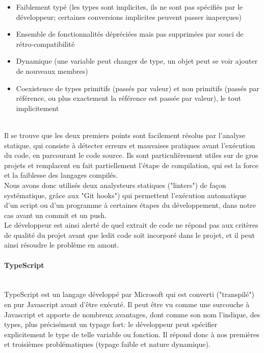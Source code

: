 \documentclass[a4paper,french,12pt]{article}
\begin{document}
		\begin{itemize}
			\item Faiblement typé (les types sont implicites, ils ne sont pas spécifiés par le développeur; certaines conversions implicites peuvent passer inaperçues)
			\item Ensemble de fonctionnalités dépréciées mais pas supprimées par souci de rétro-compatibilité
			\item Dynamique (une variable peut changer de type, un objet peut se voir ajouter de nouveaux membres)
			\item Coexistence de types primitifs (passés par valeur) et non primitifs (passés par référence, ou plus exactement la référence est passée par valeur), le tout implicitement
		\end{itemize}	~\\	
		
		Il se trouve que les deux premiers points sont facilement résolus par l'analyse statique, qui consiste à détecter erreurs et mauvaises pratiques avant l'exécution du code, en parcourant le code source.
		Ils sont particulièrement utiles sur de gros projets et remplacent en fait partiellement l'étape de compilation, qui est la force et la faiblesse des langages compilés.~\\	
		
		Nous avons donc utilisés deux analysteurs statiques ("linters") de façon systématique, grâce aux "Git hooks") qui permettent l'exécution automatique d'un script ou d'un programme à certaines étapes du développement, dans notre cas avant un commit et un push.~\\	
		
		Le développeur est ainsi alerté de quel extrait de code ne répond pas aux critères de qualité du projet avant que ledit code soit incorporé dans le projet, et il peut ainsi résoudre le problème en amont.
		
	\paragraph{TypeScript}~\\	
	
	TypeScript est un langage développé par Microsoft qui est converti ("transpilé") en pur Javascript avant d'être exécuté. Il peut être vu comme une surcouche à Javascript et apporte de nombreux avantages, dont comme son nom l'indique, des types, plus précisément un typage fort: le développeur peut spécifier explicitement le type de telle variable ou fonction. Il répond donc à nos premières et troisièmes problématiques (typage faible et nature dynamique).~\\
	
\end{document}
